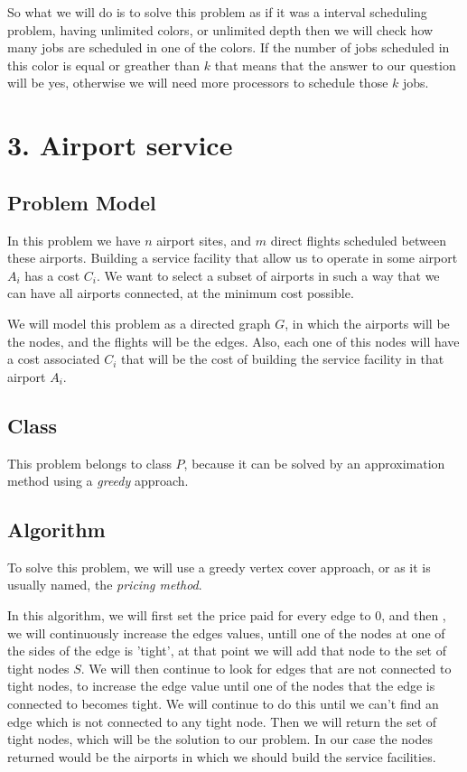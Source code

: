 \documentclass{article}
\begin{document}
So what we will do is to solve this problem as if it was a interval scheduling problem, having unlimited colors, or unlimited depth then we will check how many jobs are scheduled in one of the colors. If the number of jobs scheduled in this color is equal or greather than $k$ that means that the answer to our question will be yes, otherwise we will need more processors to schedule those $k$ jobs.

\section*{3. Airport service}

\subsection*{Problem Model}

In this problem we have $n$ airport sites, and $m$ direct flights scheduled between these airports. Building a service facility that allow us to operate in some airport $A_i$ has a cost $C_i$. We want to select a subset of airports in such a way that we can have all airports connected, at the minimum cost possible.

We will model this problem as a directed graph $G$, in which the airports will be the nodes, and the flights will be the edges. Also, each one of this nodes will have a cost associated $C_i$ that will be the cost of building the service facility in that airport $A_i$.

\subsection*{Class}

This problem belongs to class $P$, because it can be solved by an approximation method using a \textit{greedy} approach.

\subsection*{Algorithm}

To solve this problem, we will use a greedy vertex cover approach, or as it is usually named, the \textit{pricing method}.

In this algorithm, we will first set the price paid for every edge to $0$, and then , we will continuously increase the edges values, untill one of the nodes at one of the sides of the edge is 'tight', at that point we will add that node to the set of tight nodes $S$. We will then continue to look for edges that are not connected to tight nodes, to increase the edge value until one of the nodes that the edge is connected to becomes tight. We will continue to do this until we can't find an edge which is not connected to any tight node. Then we will return the set of tight nodes, which will be the solution to our problem. In our case the nodes returned would be the airports in which we should build the service facilities.
\end{document}
